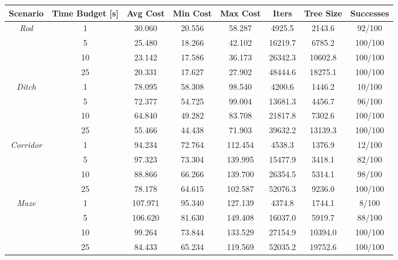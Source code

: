 \begin{table}
    \centering
    \scriptsize
    \begin{tabular}{*{8}{c}}
         Scenario & Time Budget [s] & Avg Cost & Min Cost & Max Cost & Iters & Tree Size & Successes \\
        \hline
        \multirow{4}{*}{\textit{Rod}} & 1 & 30.060 & 20.556 & 58.287 & 4925.5 & 2143.6 & 92/100 \\
         & 5 & 25.480 & 18.266 & 42.102 & 16219.7 & 6785.2 & 100/100 \\
         & 10 & 23.142 & 17.586 & 36.173 & 26342.3 & 10602.8 & 100/100 \\
         & 25 & 20.331 & 17.627 & 27.902 & 48444.6 & 18275.1 & 100/100 \\
        
        \hline                                                          
        \multirow{4}{*}{\textit{Ditch}} & 1 & 78.095 & 58.308 & 98.540 & 4200.6 & 1446.2 & 10/100 \\
         & 5 & 72.377 & 54.725 & 99.004 & 13681.3 & 4456.7 & 96/100 \\
         & 10 & 64.840 & 49.282 & 83.708 & 21817.8 & 7302.6 & 100/100 \\
         & 25 & 55.466 & 44.438 & 71.903 & 39632.2 & 13139.3 & 100/100 \\  
        
        \hline                                                            
        \multirow{4}{*}{\textit{Corridor}} & 1 & 94.234 & 72.764 & 112.454 & 4538.3 & 1376.9 & 12/100 \\
         & 5 & 97.323 & 73.304 & 139.995 & 15477.9 & 3418.1 & 82/100 \\
         & 10 & 88.866 & 66.266 & 139.700 & 26354.5 & 5314.1 & 98/100 \\
         & 25 & 78.178 & 64.615 & 102.587 & 52076.3 & 9236.0 & 100/100 \\
        
        \hline                                                                      
        \multirow{4}{*}{\textit{Maze}} & 1 & 107.971 & 95.340 & 127.139 & 4374.8 & 1744.1 & 8/100 \\
         & 5 & 106.620 & 81.630 & 149.408 & 16037.0 & 5919.7 & 88/100 \\
         & 10 & 99.264 & 73.844 & 133.529 & 27154.9 & 10394.0 & 100/100 \\
         & 25 & 84.433 & 65.234 & 119.569 & 52035.2 & 19752.6 & 100/100 \\
        

\end{tabular}
\end{table}
